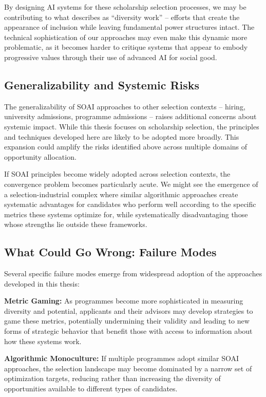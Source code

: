 By designing AI systems for these scholarship selection processes, we may be contributing to what \textcite{Ahmed_2012} describes as ``diversity work'' – efforts that create the appearance of inclusion while leaving fundamental power structures intact. The technical sophistication of our approaches may even make this dynamic more problematic, as it becomes harder to critique systems that appear to embody progressive values through their use of advanced AI for social good.

\subsection{Generalizability and Systemic Risks}
The generalizability of SOAI approaches to other selection contexts – hiring, university admissions, programme admissions – raises additional concerns about systemic impact. While this thesis focuses on scholarship selection, the principles and techniques developed here are likely to be adopted more broadly. This expansion could amplify the risks identified above across multiple domains of opportunity allocation.

If SOAI principles become widely adopted across selection contexts, the convergence problem becomes particularly acute. We might see the emergence of a selection-industrial complex where similar algorithmic approaches create systematic advantages for candidates who perform well according to the specific metrics these systems optimize for, while systematically disadvantaging those whose strengths lie outside these frameworks.

\subsection{What Could Go Wrong: Failure Modes}\label{ssec:wrongs}
Several specific failure modes emerge from widespread adoption of the approaches developed in this thesis:

\textbf{Metric Gaming:} As programmes become more sophisticated in measuring diversity and potential, applicants and their advisors may develop strategies to game these metrics, potentially undermining their validity and leading to new forms of strategic behavior that benefit those with access to information about how these systems work.

\textbf{Algorithmic Monoculture:} If multiple programmes adopt similar SOAI approaches, the selection landscape may become dominated by a narrow set of optimization targets, reducing rather than increasing the diversity of opportunities available to different types of candidates.

